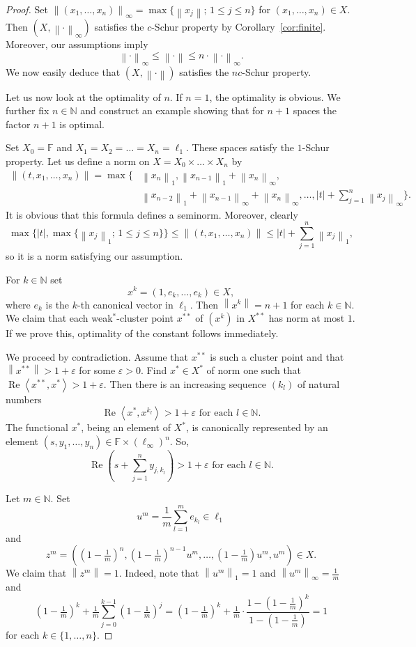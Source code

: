 \documentclass{amsart}
\numberwithin{equation}{section}
\theoremstyle{definition}
\def\ep{\varepsilon}
\def\en{\mathbb N}
\def\ef{\mathbb F}
\def\ip#1#2{\left\langle#1,#2\right\rangle}
\newcommand{\norm}[1]{\left\|#1\right\|}
\renewcommand{\Re}{\operatorname{Re}}
\newcommand{\abs}[1]{\left|#1\right|}
\newcommand{\setsep}{;\,}
\begin{document}
\begin{proof}
Set $\norm{(x_1,\dots,x_n)}_\infty=\max  \{\norm{x_j}\setsep 1\le j\le n\}$ for $(x_1,\dots,x_n)\in X$. Then $(X,\norm{\cdot}_\infty)$ satisfies the $c$-Schur property by Corollary~\ref{cor:finite}. Moreover, our assumptions imply
$$\norm{\cdot}_\infty\le \norm{\cdot}\le n\cdot\norm{\cdot}_\infty.$$
We now easily deduce that $(X,\norm{\cdot})$ satisfies the $nc$-Schur property.

Let us now look at the optimality of $n$. If $n=1$, the optimality is obvious. We further fix $n\in\en$ and construct an example showing that for $n+1$ spaces the factor $n+1$ is optimal. 

Set $X_0=\ef$ and $X_1=X_2=\dots=X_{n}=\ell_1$. These spaces satisfy the $1$-Schur property. Let us define a norm on $X=X_0\times\dots\times X_n$ by
$$\begin{aligned}
    \norm{(t,x_1,\dots,x_n)}=\max\Big\{&\norm{x_n}_1,\norm{x_{n-1}}_1+\norm{x_n}_\infty,\\&\norm{x_{n-2}}_1+\norm{x_{n-1}}_\infty+\norm{x_n}_\infty,\dots,\abs{t}+\sum_{j=1}^n\norm{x_j}_\infty\Big\}.\end{aligned}$$
It is obvious that this formula defines a seminorm. Moreover, clearly
$$\max\{\abs{t},\max\{\norm{x_j}_1\setsep 1\le j\le n\}\}\le \norm{(t,x_1,\dots,x_n)}\le \abs{t}+\sum_{j=1}^n\norm{x_j}_1,$$
so it is a norm satisfying our assumption.

For $k\in \en$ set
$$x^k=(1,e_k,\dots,e_k)\in X,$$
where $e_k$ is the $k$-th canonical vector in $\ell_1$. Then $\norm{x^k}=n+1$ for each $k\in\en$. We claim that each weak$^*$-cluster point $x^{**}$ of $(x^k)$ in $X^{**}$ has norm at most $1$. If we prove this, optimality of the constant follows immediately.

We proceed by contradiction. Assume that $x^{**}$ is such a cluster point and that $\norm{x^{**}}>1+\ep$ for some $\ep>0$. Find $x^*\in X^*$ of norm one such that $\Re\ip{x^{**}}{x^*}>1+\ep$. Then there is an increasing sequence $(k_l)$ of natural numbers
$$\Re \ip{x^*}{x^{k_l}}>1+\ep\mbox{ for each }l\in\en.$$
The functional $x^*$, being an element of $X^*$, is canonically represented by an element $(s,y_1,\dots,y_n)\in \ef\times (\ell_\infty)^n$. So,
$$\Re (s+\sum_{j=1}^n y_{j,k_l}) >1+\ep \mbox{ for each }l\in\en.$$

Let $m\in\en$. Set 
$$u^m=\frac1m\sum_{l=1}^m e_{k_l}\in\ell_1$$
and
$$z^m=((1-\tfrac1m)^n,(1-\tfrac1m)^{n-1}u^m,\dots,(1-\tfrac1m)u^m,u^m)\in X.$$
We claim that $\norm{z^m}=1$. Indeed, note that $\norm{u^m}_1=1$ and $\norm{u^m}_\infty=\frac1m$ and
$$(1-\tfrac1m)^{k} +\tfrac1m \sum_{j=0}^{k-1}(1-\tfrac1m)^j =(1-\tfrac1m)^{k} +\tfrac1m \cdot \frac{1-(1-\tfrac1m)^k}{1-(1-\tfrac1m)}=1$$
for each $k\in\{1,\dots,n\}$.


\end{proof}
\end{document}
